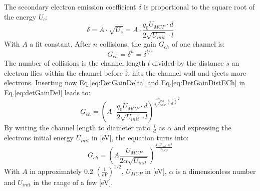 	The secondary electron emission coefficient $\delta$ is proportional to the square root of the energy $U_c$:
	\begin{equation}
		\delta = A\cdot \sqrt{U_c} = A\cdot \frac{q_0 U_{MCP}\cdot d}{2 \sqrt{U_{init}}\cdot l}
		\label{eq:DetGainDelta}
	\end{equation}
	With $A$ a fit constant. After $n$ collisions, the gain $G_{ch}$ of one channel is:
	\begin{equation}
		G_{ch} = \delta^{n} = \delta^{l/s}
		\label{eq:detGainDel}
	\end{equation}
	The number of collisions is the channel length $l$ divided by the distance $s$ an electron flies within the channel before it hits the channel wall and ejects more electrons. Inserting now Eq.\eqref{eq:DetGainDelta} and Eq.\eqref{eq:DetGainDistECh} in Eq.\eqref{eq:detGainDel} leads to:
	\begin{equation}
		G_{ch} = \left(A\cdot\frac{q_0 U_{MCP} \cdot d}{2\sqrt{U_{init}}\cdot l}\right)^{\frac{4U_{init}}{q_0 U_{MCP}}\left(\frac{l}{d}\right)^2}
	\end{equation}
	By writing the channel length to diameter ratio $\frac{l}{d}$ as $\alpha$ and expressing the electrons initial energy $U_{init}$ in [eV], the equation turns into:
	\begin{equation}
		G_{ch} = \left(A\frac{U_{MCP}}{2\alpha\sqrt{U_{init}}}\right)^{\frac{4\cdot U_{init}\cdot\alpha^2}{U_{MCP}}}
	\end{equation}
	With $A$ in approximately 0.2 $\left(\frac{1}{eV}\right)^{1/2}$, %
	$U_{MCP}$ in [eV], $\alpha$ is a dimensionless number and $U_{init}$ in the range of a few [eV].

	
	
	
